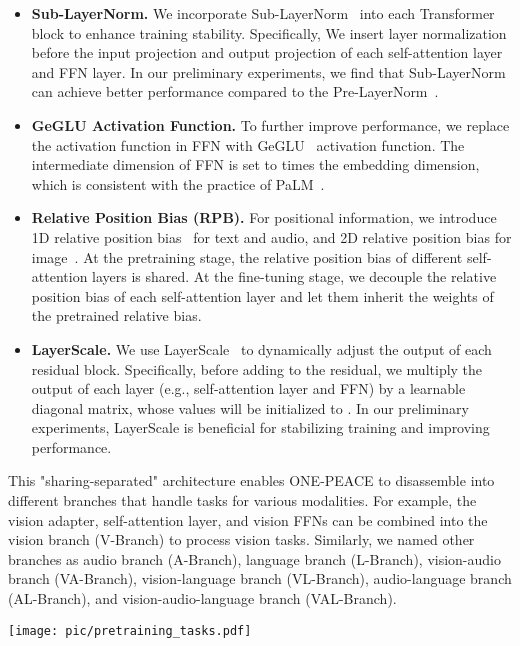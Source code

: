 \documentclass{article}
\newcommand{\onepeace}{ONE-PEACE\xspace}
\begin{document}
\begin{itemize}
    \item \textbf{Sub-LayerNorm.} We incorporate Sub-LayerNorm~\cite{magneto} into each Transformer block to enhance training stability. Specifically, We insert layer normalization before the input projection and output projection of each self-attention layer and FFN layer. In our preliminary experiments, we find that Sub-LayerNorm can achieve better performance compared to the Pre-LayerNorm~\cite{gpt3}.
    \item \textbf{GeGLU Activation Function.} To further improve performance, we replace the activation function in FFN with GeGLU~\cite{glu} activation function. The intermediate dimension of FFN is set to  times the embedding dimension, which is consistent with the practice of PaLM~\cite{palm}.
    \item \textbf{Relative Position Bias (RPB).} For positional information, we introduce 1D relative position bias~\cite{T5} for text and audio, and 2D relative position bias for image~\cite{coatnet}. At the pretraining stage, the relative position bias of different self-attention layers is shared. At the fine-tuning stage, we decouple the relative position bias of each self-attention layer and let them inherit the weights of the pretrained relative bias.
    \item \textbf{LayerScale.} We use LayerScale~\cite{cait} to dynamically adjust the output of each residual block. Specifically, before adding to the residual, we multiply the output of each layer (e.g., self-attention layer and FFN) by a learnable diagonal matrix, whose values will be initialized to . In our preliminary experiments, LayerScale is beneficial for stabilizing training and improving performance.
\end{itemize}

This "sharing-separated" architecture enables \onepeace to disassemble into different branches that handle tasks for various modalities.
For example, the vision adapter, self-attention layer, and vision FFNs can be combined into the vision branch (V-Branch) to process vision tasks.
Similarly, we named other branches as audio branch (A-Branch), language branch (L-Branch), vision-audio branch (VA-Branch), vision-language branch (VL-Branch), audio-language branch (AL-Branch), and vision-audio-language branch (VAL-Branch).

\begin{figure*}[t]
\vskip 0.2in
    \centering
    \texttt{[image: pic/pretraining\_tasks.pdf]}
    \caption{\textbf{The pretraining tasks of \onepeace.} Intra-modal denoising contrastive learning encourages the features of the masked units (e.g., image patches or text tokens) close to the positive units (indicated by the green lines) and get away from the negative units (indicated by the red lines). Note that we compute the cross-modal contrastive loss by gathering negative features from all GPU devices, while the denoising contrastive loss is computed on the local batch.}
    \label{fig:loss}
\end{figure*}
\end{document}
